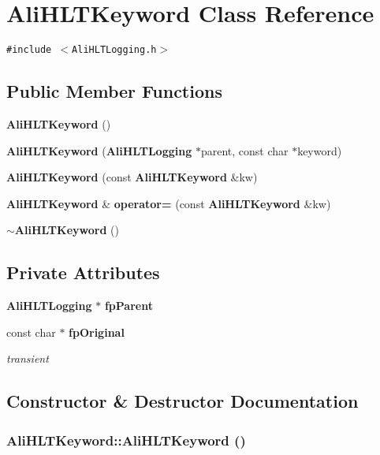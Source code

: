 \section{Ali\-HLTKeyword Class Reference}
\label{classAliHLTKeyword}
{\tt \#include $<$Ali\-HLTLogging.h$>$}

\subsection*{Public Member Functions}
\begin{CompactItemize}
\item 
{\bf Ali\-HLTKeyword} ()
\item 
{\bf Ali\-HLTKeyword} ({\bf Ali\-HLTLogging} $\ast$parent, const char $\ast$keyword)
\item 
{\bf Ali\-HLTKeyword} (const {\bf Ali\-HLTKeyword} \&kw)
\item 
{\bf Ali\-HLTKeyword} \& {\bf operator=} (const {\bf Ali\-HLTKeyword} \&kw)
\item 
{\bf $\sim$Ali\-HLTKeyword} ()
\end{CompactItemize}
\subsection*{Private Attributes}
\begin{CompactItemize}
\item 
{\bf Ali\-HLTLogging} $\ast$ {\bf fp\-Parent}
\item 
const char $\ast$ {\bf fp\-Original}
\begin{CompactList}\small\item\em transient \item\end{CompactList}\end{CompactItemize}


\subsection{Constructor \& Destructor Documentation}
\subsubsection{\setlength{\rightskip}{0pt plus 5cm}Ali\-HLTKeyword::Ali\-HLTKeyword ()\hspace{0.3cm}{\tt  [inline]}}\label{classAliHLTKeyword_a0}





